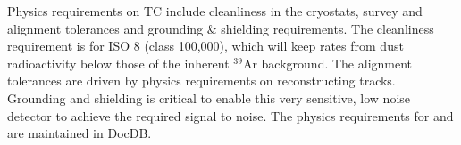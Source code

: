 Physics requirements on TC include cleanliness in the cryostats,
survey and alignment tolerances and grounding \& shielding
requirements. The cleanliness requirement is for ISO 8 (class
100,000), which will keep rates from dust radioactivity below those of
the inherent $^{39}$Ar background. The alignment tolerances are driven
by physics requirements on reconstructing tracks. Grounding and
shielding is critical to enable this very sensitive, low noise
detector to achieve the required signal to noise. The physics
requirements for  and  are maintained in
DocDB.







